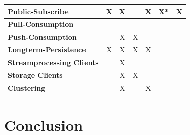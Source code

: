 \begin{landscape}
\begin{table}[h]
\begin{tabular}{|p{3cm}|p{3cm}|p{3cm}|p{3cm}|p{3cm}|p{3cm}|p{3cm}|}
        \textbf{Public-Subscribe}          & \multicolumn{1}{c|}{X}       & \multicolumn{1}{c|}{X}                                                 & \multicolumn{1}{c|}{}  & \multicolumn{1}{c|}{X}  & X* & \multicolumn{1}{c|}{X}     \\ \hline
        \textbf{Pull-Consumption}          &                              &                                                   &                        &                         &                                                         &                            \\ \hline
        \textbf{Push-Consumption}          &                              &  \multicolumn{1}{c|}{X}                                                   & \multicolumn{1}{c|}{X} &                         &                                                         &                            \\ \hline
        \textbf{Longterm-Persistence}      & \multicolumn{1}{c|}{X}       &  \multicolumn{1}{c|}{X}                                                & \multicolumn{1}{c|}{X} & \multicolumn{1}{c|}{X}  &                                                         &                            \\ \hline
        \textbf{Streamprocessing Clients}  &                              &  \multicolumn{1}{c|}{X}                                                 &                        & \multicolumn{1}{c|}{}   &                                                         &                            \\ \hline
        \textbf{Storage Clients}           &                              &  \multicolumn{1}{c|}{X}                                               & \multicolumn{1}{c|}{X} &                         &                                                         &                            \\ \hline
        \textbf{Clustering}                &                              &  \multicolumn{1}{c|}{X}                                                    &                        & \multicolumn{1}{c|}{X}  &                                                         &                            \\ \hline
    \end{tabular}
\end{table}

\end{landscape}

\section{Conclusion}






